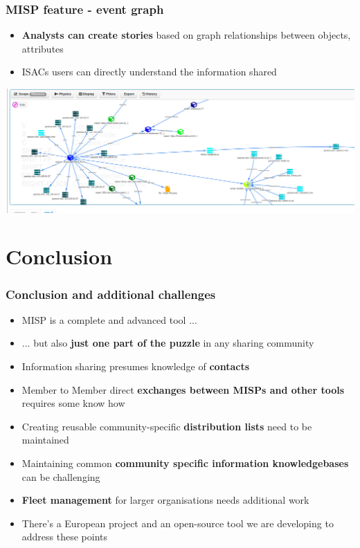 \begin{frame}
    \frametitle{MISP feature - event graph}
    \begin{itemize}
        \item \textbf{Analysts can create stories} based on graph relationships between objects, attributes
         \item ISACs users can directly understand the information shared
    \end{itemize}
    \includegraphics[scale=0.20]{../images/event-graph.png}
\end{frame}

\section{Conclusion}

\begin{frame}
	\frametitle{Conclusion and additional challenges}
	\begin{itemize}
		\item MISP is a complete and advanced tool ...
		\item ... but also \textbf{just one part of the puzzle} in any sharing community
		\item Information sharing presumes knowledge of \textbf{contacts}
		\item Member to Member direct \textbf{exchanges between MISPs and other tools} requires some know how
		\item Creating reusable community-specific \textbf{distribution lists} need to be maintained
		\item Maintaining common \textbf{community specific information knowledgebases} can be challenging
		\item \textbf{Fleet management} for larger organisations needs additional work
        \item There's a European project and an open-source tool we are developing to address these points
	\end{itemize}
\end{frame}

